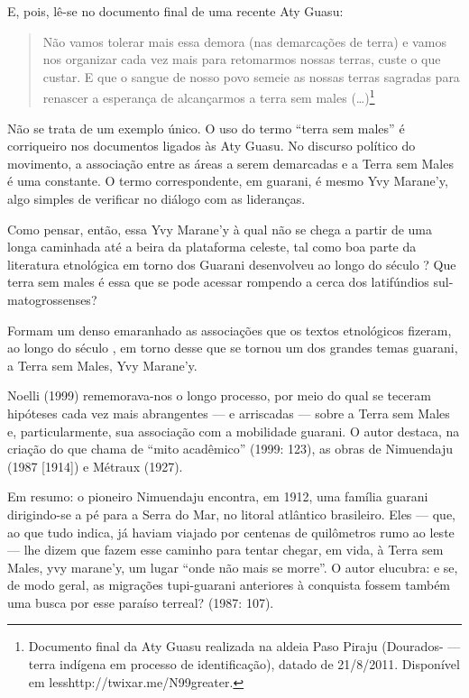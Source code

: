 E, pois, lê-se no documento final de uma recente Aty Guasu:

\begin{quotation}
Não vamos tolerar mais essa demora (nas demarcações de terra) e vamos
nos organizar cada vez mais para retomarmos nossas terras, custe o que
custar. E que o sangue de nosso povo semeie as nossas terras sagradas
para renascer a esperança de alcançarmos a terra sem males
(\ldots{})\footnote{Documento final da Aty Guasu realizada na aldeia Paso
Piraju (Dourados- — terra indígena em processo de identificação),
datado de 21/8/2011. Disponível em
{less}http://twixar.me/N99{greater}.}
\end{quotation}

Não se trata de um exemplo único. O uso do termo ``terra sem males'' é
corriqueiro nos documentos ligados às Aty Guasu. No discurso político
do movimento, a associação entre as áreas a serem demarcadas e a Terra
sem Males é uma constante. O termo correspondente, em guarani, é mesmo
Yvy Marane’y, algo simples de verificar no diálogo com as lideranças.

Como pensar, então, essa Yvy Marane’y à qual não se chega a partir de
uma longa caminhada até a beira da plataforma celeste, tal como boa
parte da literatura etnológica em torno dos Guarani desenvolveu ao
longo do século ? Que terra sem males é essa que se pode acessar
rompendo a cerca dos latifúndios sul-matogrossenses?

Formam um denso emaranhado as associações que os textos etnológicos
fizeram, ao longo do século , em torno desse que se tornou um dos
grandes temas guarani, a Terra sem Males, Yvy Marane’y.

Noelli (1999) rememorava-nos o longo processo, por meio do qual se
teceram hipóteses cada vez mais abrangentes — e arriscadas — sobre a
Terra sem Males e, particularmente, sua associação com a mobilidade
guarani. O autor destaca, na criação do que chama de ``mito acadêmico''
(1999: 123), as obras de Nimuendaju (1987 [1914]) e Métraux (1927).

Em resumo: o pioneiro Nimuendaju encontra, em 1912, uma família guarani
dirigindo-se a pé para a Serra do Mar, no litoral atlântico brasileiro.
Eles — que, ao que tudo indica, já haviam viajado por centenas de
quilômetros rumo ao leste — lhe dizem que fazem esse caminho para
tentar chegar, em vida, à Terra sem Males, yvy marane’y, um lugar ``onde
não mais se morre''. O autor elucubra: e se, de modo geral, as migrações
tupi-guarani anteriores à conquista fossem também uma busca por esse
paraíso terreal? (1987: 107).

